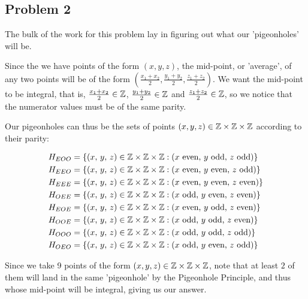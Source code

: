 \documentclass[10pt]{article}
\begin{document}
\newpage
\subsection*{Problem 2}

The bulk of the work for this problem lay in figuring out
what our 'pigeonholes' will be. 
\spacing

\noindent
Since the we have points of the form $(x, y, z)$, the mid-point, or 'average', of any two 
points will be of the form $(\frac{x_{1} + x_{2}}{2}, \frac{y_{1} + y_{2}}{2}, \frac{z_{1} + z_{2}}{2})$.
We want the mid-point to be integral, that is, $\frac{x_{1} + x_{2}}{2} \in \mathbb{Z}$, 
$\frac{y_{1} + y_{2}}{2} \in \mathbb{Z}$ and $\frac{z_{1} + z_{2}}{2} \in \mathbb{Z}$, so we notice that the numerator
values must be of the same parity.
\spacing

\noindent
Our pigeonholes can thus be the sets of points $(x, y, z) \in \mathbb{Z} \times \mathbb{Z} \times \mathbb{Z}$ according to their parity:
\vspace*{-15pt}

\begin{align*}
  H_{EOO} &= \{\text{($x$, $y$, $z$)} \in \mathbb{Z} \times \mathbb{Z} \times \mathbb{Z} : (x \text{ even, } y \text{ odd,  } z \text{ odd})\}  \\
  H_{EEO} &= \{\text{($x$, $y$, $z$)} \in \mathbb{Z} \times \mathbb{Z} \times \mathbb{Z} : (x \text{ even, } y \text{ even, } z \text{ odd})\}  \\
  H_{EEE} &= \{\text{($x$, $y$, $z$)} \in \mathbb{Z} \times \mathbb{Z} \times \mathbb{Z} : (x \text{ even, } y \text{ even, } z \text{ even})\} \\
  H_{OEE} &= \{\text{($x$, $y$, $z$)} \in \mathbb{Z} \times \mathbb{Z} \times \mathbb{Z} : (x \text{ odd,  } y \text{ even, } z \text{ even})\} \\
  H_{EOE} &= \{\text{($x$, $y$, $z$)} \in \mathbb{Z} \times \mathbb{Z} \times \mathbb{Z} : (x \text{ even, } y \text{ odd,  } z \text{ even})\} \\
  H_{OOE} &= \{\text{($x$, $y$, $z$)} \in \mathbb{Z} \times \mathbb{Z} \times \mathbb{Z} : (x \text{ odd,  } y \text{ odd,  } z \text{ even})\} \\
  H_{OOO} &= \{\text{($x$, $y$, $z$)} \in \mathbb{Z} \times \mathbb{Z} \times \mathbb{Z} : (x \text{ odd,  } y \text{ odd,  } z \text{ odd})\}  \\
  H_{OEO} &= \{\text{($x$, $y$, $z$)} \in \mathbb{Z} \times \mathbb{Z} \times \mathbb{Z} : (x \text{ odd,  } y \text{ even, } z \text{ odd})\}
\end{align*}

\noindent
Since we take 9 points of the form $(x, y, z) \in \mathbb{Z} \times \mathbb{Z} \times \mathbb{Z}$, note that at least $2$ of them will land
in the same 'pigeonhole' by the Pigeonhole Principle, and thus whose mid-point will be integral, giving us our answer.
\end{document}
